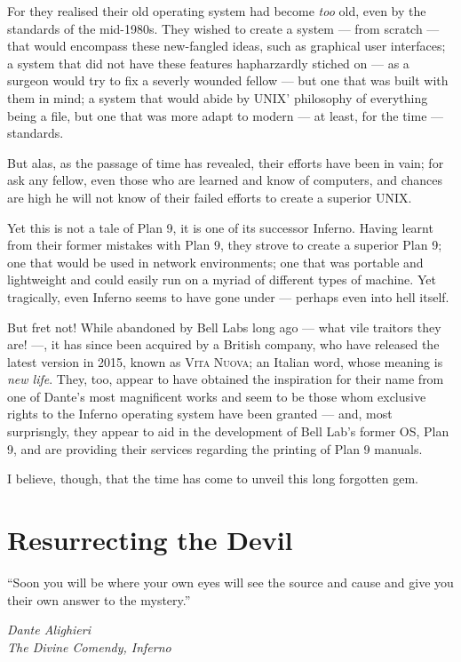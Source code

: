 \documentclass[a5paper,twoside,12pt]{report}
\begin{document}
For they realised their old operating system had become \textit{too} old, even by the standards of the mid-1980s. They wished to create a system — from scratch — that would encompass these new-fangled ideas, such as graphical user interfaces; a system that did not have these features hapharzardly stiched on — as a surgeon would try to fix a severly wounded fellow — but one that was built with them in mind; a system that would abide by UNIX' philosophy of everything being a file, but one that was more adapt to modern — at least, for the time — standards.

But alas, as the passage of time has revealed, their efforts have been in vain; for ask any fellow, even those who are learned and know of computers, and chances are high he will not know of their failed efforts to create a superior UNIX.

Yet this is not a tale of Plan 9, it is one of its successor Inferno. Having learnt from their former mistakes with Plan 9, they strove to create a superior Plan 9; one that would be used in network environments; one that was portable and lightweight and could easily run on a myriad of different types of machine.
Yet tragically, even Inferno seems to have gone under — perhaps even into hell itself.

But fret not! While abandoned by Bell Labs long ago — what vile traitors they are! —, it has since been acquired by a British company, who have released the latest version in 2015, known as \textsc{Vita Nuova}; an Italian word, whose meaning is \textit{new life}. They, too, appear to have obtained the inspiration for their name from one of Dante's most magnificent works and seem to be those whom exclusive rights to the Inferno operating system have been granted — and, most surprisngly, they appear to aid in the development of Bell Lab's former OS, Plan 9, and are providing their services regarding the printing of Plan 9 manuals.

I believe, though, that the time has come to unveil this long forgotten gem. \newpage

\chapter*{Resurrecting the Devil}

  \epigraph{``Soon you will be where your own eyes will see the source and cause and give you their own answer to the mystery.''}{\textit{Dante Alighieri\\The Divine Comendy, Inferno}}
\end{document}
